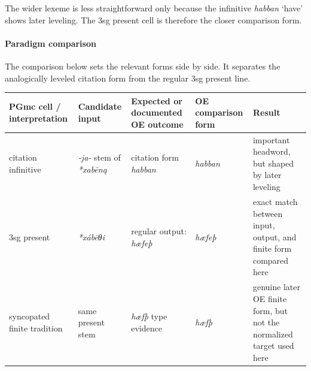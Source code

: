 \documentclass[
  british,
  a4paper,
]{article}
\newcounter{none} %
\begin{document}
The wider lexeme is less straightforward only because the infinitive
{\emph{habban}} `have' shows later leveling. The 3sg present cell is
therefore the closer comparison form.

\paragraph{Paradigm comparison}\label{paradigm-comparison-9}

The comparison below sets the relevant forms side by side. It separates
the analogically leveled citation form from the regular 3sg present
line.

{\def\LTcaptype{none} %
\begin{longtable}[]{@{}
  >{\raggedright\arraybackslash}p{}
  >{\raggedright\arraybackslash}p{}
  >{\raggedright\arraybackslash}p{}
  >{\raggedright\arraybackslash}p{}
  >{\raggedright\arraybackslash}p{}@{}}
\toprule\noalign{}
\begin{minipage}[b]{\linewidth}\raggedright
PGmc cell / interpretation
\end{minipage} & \begin{minipage}[b]{\linewidth}\raggedright
Candidate input
\end{minipage} & \begin{minipage}[b]{\linewidth}\raggedright
Expected or documented OE outcome
\end{minipage} & \begin{minipage}[b]{\linewidth}\raggedright
OE comparison form
\end{minipage} & \begin{minipage}[b]{\linewidth}\raggedright
Result
\end{minipage} \\
\midrule\noalign{}
\endhead
\bottomrule\noalign{}
\endlastfoot
citation infinitive & \emph{-ja-} stem of {\emph{*xabēną}} & citation
form {\emph{habban}} & {\emph{habban}} & important headword, but shaped
by later leveling \\
3sg present & {\emph{*xábēθi}} & regular output: {\emph{hæfeþ}} &
{\emph{hæfeþ}} & exact match between input, output, and finite form
compared here \\
syncopated finite tradition & same present stem & {\emph{hæfþ}} type
evidence & {\emph{hæfþ}} & genuine later OE finite form, but not the
normalized target used here \\
\end{longtable}
}
\end{document}
